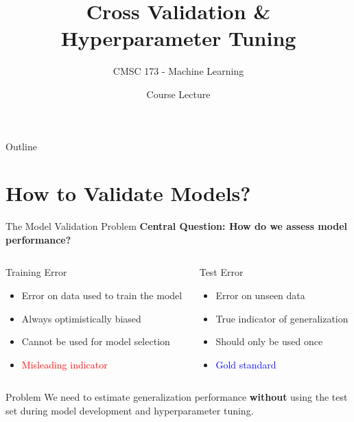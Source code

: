 \documentclass[8pt,aspectratio=1610]{beamer}
\title{Cross Validation \& Hyperparameter Tuning}
\subtitle{CMSC 173 - Machine Learning}
\author{Course Lecture}
\date{}
\begin{document}
\begin{frame}
\titlepage
\end{frame}

\begin{frame}{Outline}
\tableofcontents
\end{frame}


\section{How to Validate Models?}

\begin{frame}{The Model Validation Problem}
\centering
\textbf{Central Question: How do we assess model performance?}

\vspace{0.5cm}

\begin{columns}[t]
\begin{column}{0.48\textwidth}
\begin{block}{Training Error}
\begin{itemize}
\setlength{\itemsep}{2pt}
\item Error on data used to train the model
\item Always optimistically biased
\item Cannot be used for model selection
\item \textcolor{red}{Misleading indicator}
\end{itemize}
\end{block}
\end{column}

\begin{column}{0.48\textwidth}
\begin{block}{Test Error}
\begin{itemize}
\setlength{\itemsep}{2pt}
\item Error on unseen data
\item True indicator of generalization
\item Should only be used once
\item \textcolor{blue}{Gold standard}
\end{itemize}
\end{block}
\end{column}
\end{columns}

\vspace{0.3cm}

\begin{alertblock}{Problem}
We need to estimate generalization performance \textbf{without} using the test set during model development and hyperparameter tuning.
\end{alertblock}
\end{frame}
\end{document}
